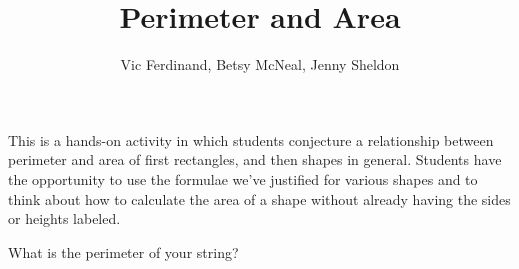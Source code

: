 \documentclass{ximera}
\title{Perimeter and Area}
\author{Vic Ferdinand, Betsy McNeal, Jenny Sheldon}
\begin{document}
\begin{abstract}\end{abstract}
\maketitle

\begin{instructorIntro}
This is a hands-on activity in which students conjecture a relationship between perimeter and area of first rectangles, and then shapes in general.  Students have the opportunity to use the formulae we've justified for various shapes and to think about how to calculate the area of a shape without already having the sides or heights labeled.


\end{instructorIntro}

\begin{problem}
What is the perimeter of your string?  \end{problem}
\end{document}
